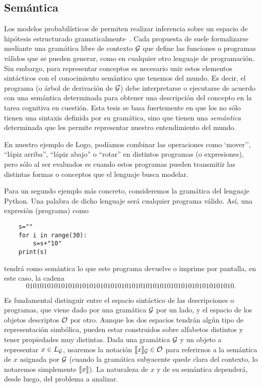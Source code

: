 \subsection{Semántica}\label{sub:semantica}

Los modelos probabilísticos de \lot permiten realizar inferencia sobre un espacio de hipótesis estructurado gramaticalmente~\cite{goodman2008rational}. Cada propuesta de \lot suele formalizarse mediante una gramática libre de contexto $ \gram $ que define las funciones o programas válidos que se pueden generar, como en cualquier otro lenguaje de programación. Sin embargo, para representar conceptos es necesario unir estos elementos sintácticos con el conocimiento semántico que tenemos del mundo. Es decir, el programa (o árbol de derivación de $ \gram $) debe interpretarse o ejecutarse de acuerdo con una semántica determinada para obtener una descripción del concepto en la tarea cognitiva en cuestión. Esta tesis se basa fuertemente en que los \lot no sólo tienen una sintaxis definida por su gramática, sino que tienen una {\em semántica} determinada que les permite representar nuestro entendimiento del mundo.

En nuestro ejemplo de Logo, podíamos combinar las operaciones como `mover'', ``lápiz arriba'', ``lápiz abajo'' o ``rotar'' en distintos programas (o expresiones), pero sólo al ser evaluados es cuando estos programas pueden transmitir las distintas formas o conceptos que el lenguaje busca modelar.



Para un segundo ejemplo más concreto, consideremos la gramática del lenguaje Python. Una palabra de dicho lenguaje será cualquier programa válido. Así, una expresión (programa) como 
%
\begin{verbatim}
    s=""
    for i in range(30):
        s=s+"10"
    print(s)
\end{verbatim}
%
tendrá como semántica lo que este programa devuelve o imprime por pantalla, en este caso, la cadena
$$
01010101010101010101010101010101010101010101010101010101010.
$$

Es fundamental distinguir entre el espacio sintáctico de las descripciones o programas, que viene dado por una gramática $\gram$ por un lado, y el espacio de los objetos descriptos $\+O$ por otro. Aunque los dos espacios tendrán algún tipo de representación simbólica, pueden estar construidos sobre alfabetos distintos y tener propiedades muy distintas. Dada una gramática $\gram$ y un objeto a representar $x\in L_\gram$, usaremos la notación $\sem{x}_\gram\in\+O$ para referirnos a la semántica de $x$ asignada por $\gram$ (cuando la gramática subyacente quede clara del contexto, lo notaremos simplemente $\sem{x}$). La naturaleza de $x$ y de su semántica dependerá, desde luego, del problema a analizar. 

